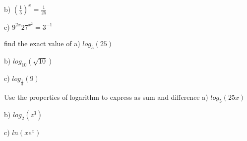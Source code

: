 \documentclass{exam}
\begin{document}
\begin{questions}
	\subitem b) \((\frac{1}{5})^{x}=\frac{1}{25}\) \hfill\enspace\hrulefill 
	
	\subitem c) \(9^{2x}27^{x^2}=3^{-1}\) 
	\hfill\enspace\hrulefill 
	
	\clearpage
	\question find the exact value of 
	\subitem a) \(log_5(25)\) \hfill\enspace\hrulefill 
	
	\subitem b) \(log_{10}(\sqrt{10})\) \hfill\enspace\hrulefill 
	
	\subitem c) \(log_{\frac{1}{3}}(9)\) \hfill\enspace\hrulefill 
	
	
	\clearpage
	\question Use the properties of logarithm to express as sum and difference 
	\subitem a) \(log_5(25x)\) \hfill\enspace\hrulefill 
	
	\subitem b) \(log_{2}(z^3)\) \hfill\enspace\hrulefill 
	
	\subitem c) \(ln(xe^x)\) \hfill\enspace\hrulefill 
\end{questions}
\clearpage
\end{document}
